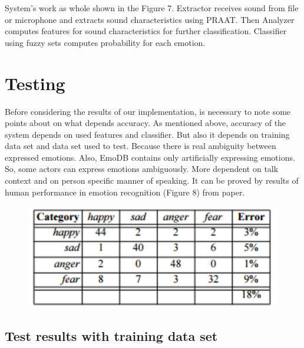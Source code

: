 \documentclass[12pt, letterpaper]{article}
\begin{document}
System's work as whole shown in the Figure 7. Extractor receives sound from file or microphone and extracts sound characteristics using PRAAT. Then Analyzer computes features for sound characteristics for further classification. Classifier using fuzzy sets computes probability for each emotion.

\section{Testing}
Before considering the results of our implementation, is necessary to note some points about on what depends accuracy. As mentioned above, accuracy of the system depends on used features and classifier. But also it depends on training data set and data set used to test. Because there is real ambiguity between expressed emotions. Also, EmoDB contains only artificially expressing emotions. So, some actors can express emotions ambiguously. More dependent on talk context and on person specific manner of speaking. It can be proved by results of human performance in emotion recognition (Figure 8) from \cite{frankthomas} paper.
\begin{figure}[h]
	\centering
	\includegraphics[scale=0.3]{images/h_performance.png}
	\caption{}
	\label{fig:human-perforance}
\end{figure}

\subsection{Test results with training data set}
\end{document}
